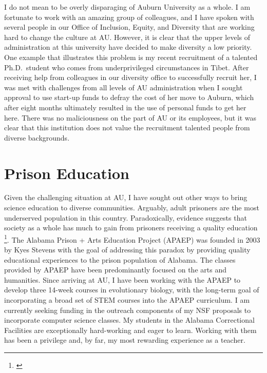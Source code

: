 I do not mean to be overly disparaging of Auburn University as a whole.
I am fortunate to work with an amazing group of colleagues, and
I have spoken with several people in our Office of Inclusion, Equity, and
Diversity that are working hard to change the culture at AU.
However, it is clear that the upper levels of administration at this university
have decided to make diversity a low priority.
One example that illustrates this problem is my recent recruitment of a
talented Ph.D.\ student who comes from underprivileged circumstances in Tibet.
After receiving help from colleagues in our diversity office to successfully
recruit her, I was met with challenges from all levels of AU administration
when I sought approval to use start-up funds to defray the cost of her move to
Auburn,
which after eight months ultimately resulted in the use of personal funds to
get her here.
There was no maliciousness on the part of AU or its employees,
but it was clear that this institution does not value the recruitment talented
people from diverse backgrounds.


\section*{Prison Education}
Given the challenging situation at AU, I have sought out other ways to bring
science education to diverse communities.
Arguably, adult prisoners are the most underserved population in this country.
Paradoxically, evidence suggests that society as a whole has much to 
gain from prisoners receiving a quality education
\footnote{\label{Vacca04}}.
The Alabama Prison + Arts Education Project (APAEP) was founded in 2003 by Kyes
Stevens with the goal of addressing this paradox by providing quality
educational experiences to the prison population of Alabama.
The classes provided by APAEP have been predominantly focused on the
arts and humanities.
Since arriving at AU, I have been working with the APAEP to develop three
14-week courses in evolutionary biology, with the long-term goal of
incorporating a broad set of STEM courses into the APAEP curriculum.
I am currently seeking funding in the outreach components of my NSF proposals
to incorporate computer science classes.
My students in the Alabama Correctional Facilities are exceptionally hard-working
and eager to learn.
Working with them has been a privilege and, by far, my most rewarding
experience as a teacher.
